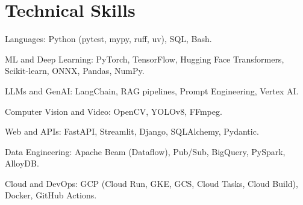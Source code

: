 \documentclass[a4paper,10pt]{article}
\begin{document}
\section{Technical Skills}
\begin{dashlist}
    \item Languages: Python (pytest, mypy, ruff, uv), SQL, Bash.
    \item ML and Deep Learning: PyTorch, TensorFlow,
        Hugging Face Transformers, Scikit-learn, ONNX, Pandas, NumPy.
    \item LLMs and GenAI: LangChain, RAG pipelines,
        Prompt Engineering, Vertex AI.
    \item Computer Vision and Video: OpenCV, YOLOv8, FFmpeg.
    \item Web and APIs: FastAPI, Streamlit, Django, SQLAlchemy,
        Pydantic.
    \item Data Engineering: Apache Beam (Dataflow), Pub/Sub,
        BigQuery, PySpark, AlloyDB.
    \item Cloud and DevOps: GCP (Cloud Run, GKE, GCS, Cloud Tasks,
        Cloud Build), Docker, GitHub Actions.
\end{dashlist}
\end{document}
